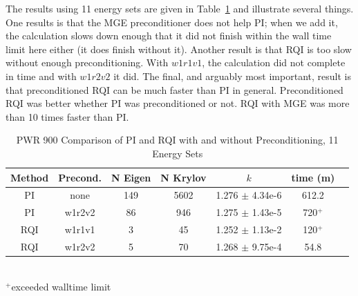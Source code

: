 \documentclass{article}                                                                           %
\begin{document}
The results using 11 energy sets are given in Table~\ref{tab:PWR all} and illustrate several things. One results is that the MGE preconditioner does not help PI; when we add it, the calculation slows down enough that it did not finish within the wall time limit here either (it does finish without it). Another result is that RQI is too slow without enough preconditioning. With $w1r1v1$, the calculation did not complete in time and with $w1r2v2$ it did. The final, and arguably most important, result is that preconditioned RQI can be much faster than PI in general. 
Preconditioned RQI was better whether PI was preconditioned or not. RQI with MGE was more than 10 times faster than PI. 
%
\begin{table}[!h]
\caption{PWR 900 Comparison of PI and RQI with and without Preconditioning, 11 Energy Sets}
\label{tab:PWR all}
  \begin{center}
    \begin{tabular}{| c | c | c | c | c | c | c |}
      \hline
      Method & Precond. & N Eigen & N Krylov & $k$ & time (m) \\\hline
      PI  & none   & 149 & 5602 & 1.276 $\pm$ 4.34e-6 & 612.2 \\
      PI  & w1r2v2 & 86  & 946  & 1.275 $\pm$ 1.43e-5 & 720$^+$ \\\hline
      RQI & w1r1v1 & 3   & 45   & 1.252 $\pm$ 1.13e-2 & 120$^+$ \\
      RQI & w1r2v2 & 5   & 70   & 1.268 $\pm$ 9.75e-4 & 54.8 \\
      \hline
    \end{tabular}\\
    $^{+}$exceeded walltime limit\\
  \end{center}
\end{table}
\end{document}
